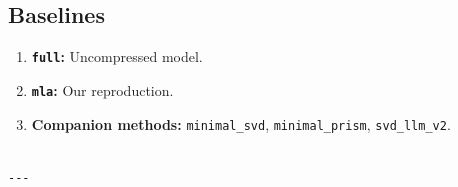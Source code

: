 \subsection{Baselines}

\begin{enumerate}
\item \textbf{\texttt{full}:} Uncompressed model.
\item \textbf{\texttt{mla}:} Our reproduction.
\item \textbf{Companion methods:} \texttt{minimal\_svd}, \texttt{minimal\_prism}, \texttt{svd\_llm\_v2}.
\end{enumerate}
\begin{lstlisting}

---
\end{lstlisting}